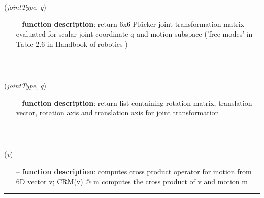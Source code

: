 \begin{itemize}[leftmargin=1.4cm]
\begin{itemize}[leftmargin=0.5cm]
\begin{itemize}[leftmargin=1.4cm]
\begin{itemize}[leftmargin=1.4cm]
\begin{itemize}[leftmargin=0.5cm]
\begin{itemize}[leftmargin=1.4cm]
\begin{itemize}[leftmargin=0.5cm]
\begin{itemize}[leftmargin=1.4cm]
\begin{itemize}[leftmargin=1.4cm]
\begin{itemize}[leftmargin=1.4cm]
\begin{flushleft}
\label{sec:kinematicTree:JointTransformMotionSubspace66}
({\it jointType}, {\it q})
\end{flushleft}
\setlength{\itemindent}{0.7cm}
\begin{itemize}[leftmargin=0.7cm]
  \item[--]  {\bf function description}: return 6x6 Pl\"ucker joint transformation matrix evaluated for scalar joint coordinate q and motion subspace ('free modes' in Table 2.6 in Handbook of robotics \cite{Siciliano2016})\vspace{12pt}\end{itemize}
%
\noindent\rule{8cm}{0.75pt}\vspace{1pt} \\ 
\begin{flushleft}
\label{sec:kinematicTree:JointTransformMotionSubspace}
({\it jointType}, {\it q})
\end{flushleft}
\setlength{\itemindent}{0.7cm}
\begin{itemize}[leftmargin=0.7cm]
  \item[--]  {\bf function description}: return list containing rotation matrix, translation vector, rotation axis and translation axis for joint transformation\vspace{12pt}\end{itemize}
%
\noindent\rule{8cm}{0.75pt}\vspace{1pt} \\ 
\begin{flushleft}
\label{sec:kinematicTree:CRM}
({\it v})
\end{flushleft}
\setlength{\itemindent}{0.7cm}
\begin{itemize}[leftmargin=0.7cm]
  \item[--]  {\bf function description}: computes cross product operator for motion from 6D vector v; CRM(v) @ m computes the cross product of v and motion m\vspace{12pt}\end{itemize}
%
\noindent\rule{8cm}{0.75pt}\vspace{1pt} \\ 

\end{itemize}
\end{itemize}
\end{itemize}
\end{itemize}
\end{itemize}
\end{itemize}
\end{itemize}
\end{itemize}
\end{itemize}
\end{itemize}
